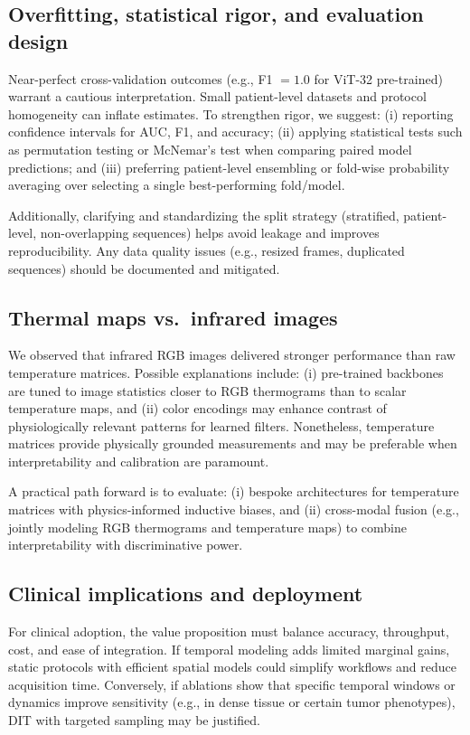 \subsection{Overfitting, statistical rigor, and evaluation design}
Near-perfect cross-validation outcomes (e.g., F1 $=1.0$ for ViT-32
pre-trained) warrant a cautious interpretation. Small patient-level
datasets and protocol homogeneity can inflate estimates. To strengthen
rigor, we suggest: (i) reporting confidence intervals for AUC, F1, and
accuracy; (ii) applying statistical tests such as permutation testing
or McNemar’s test when comparing paired model predictions; and (iii)
preferring patient-level ensembling or fold-wise probability averaging
over selecting a single best-performing fold/model.

Additionally, clarifying and standardizing the split strategy
(stratified, patient-level, non-overlapping sequences) helps avoid
leakage and improves reproducibility. Any data quality issues (e.g.,
resized frames, duplicated sequences) should be documented and
mitigated.

\subsection{Thermal maps vs.\ infrared images}
We observed that infrared RGB images delivered stronger performance
than raw temperature matrices. Possible explanations include: (i)
pre-trained backbones are tuned to image statistics closer to RGB
thermograms than to scalar temperature maps, and (ii) color encodings
may enhance contrast of physiologically relevant patterns for learned
filters. Nonetheless, temperature matrices provide physically grounded
measurements and may be preferable when interpretability and
calibration are paramount.

A practical path forward is to evaluate: (i) bespoke architectures for
temperature matrices with physics-informed inductive biases, and (ii)
cross-modal fusion (e.g., jointly modeling RGB thermograms and
temperature maps) to combine interpretability with discriminative
power.

\subsection{Clinical implications and deployment}
For clinical adoption, the value proposition must balance accuracy,
throughput, cost, and ease of integration. If temporal modeling adds
limited marginal gains, static protocols with efficient spatial models
could simplify workflows and reduce acquisition time. Conversely, if
ablations show that specific temporal windows or dynamics improve
sensitivity (e.g., in dense tissue or certain tumor phenotypes), DIT
with targeted sampling may be justified.

